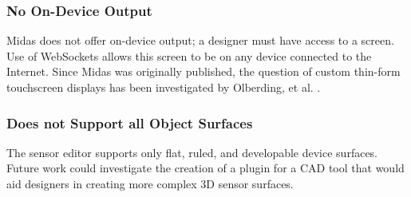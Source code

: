 \subsubsection{No On-Device Output}
Midas does not offer on-device output; a designer must have access to a screen. Use of WebSockets allows this screen to be on any device connected to the Internet. Since Midas was originally published, the question of custom thin-form touchscreen displays has been investigated by Olberding, et al. \cite{olberding-printscreen}.

\subsubsection{Does not Support all Object Surfaces}
The sensor editor supports only flat, ruled, and developable device surfaces. Future work could investigate the creation of a plugin for a CAD tool that would aid designers in creating more complex 3D sensor surfaces.